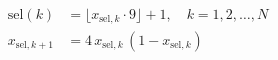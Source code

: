 \documentclass[preview,border=4pt]{standalone}
\begin{document}
\begin{align}
\mathrm{sel}(k) &= \lfloor x_{\mathrm{sel},k} \cdot 9 \rfloor + 1, \quad k=1,2,\ldots,N \\
x_{\mathrm{sel},k+1} &= 4\,x_{\mathrm{sel},k}\,(1-x_{\mathrm{sel},k})
\end{align}
\end{document}
